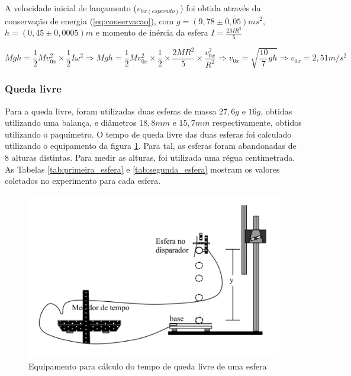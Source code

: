 \documentclass[10pt]{article}
\begin{document}
A velocidade inicial de lançamento ($v_{0x (esperado)}$) foi obtida através da conservação de energia (\ref{eq:conservacao}), com $g = (9,78 \pm 0,05) ms^2$, $h = (0,45 \pm 0,0005)m$ e momento de inércia da esfera $I = \frac{2MR^2}{5}$


\begin{equation}
Mgh = \frac{1}{2}Mv_{0x}^2 \times \frac{1}{2}I\omega^2 \Rightarrow
Mgh = \frac{1}{2}Mv_{0x}^2 \times \frac{1}{2} \times \frac{2MR^2}{5}  \times \frac{v_{0x}^2}{R^2} \Rightarrow
v_{0x} = \sqrt{\frac{10}{7}gh} \Rightarrow v_{0x} = 2,51 m/s^2
\label{eq:conservacao}
\end{equation}

\subsubsection{Queda livre}

Para a queda livre, foram utilizadas duas esferas de massa  $27,6g$ e $16g$, obtidas utilizando uma balança, e diâmetros $18,8mm$ e $15,7mm$ respectivamente, obtidos utilizando o paquímetro. O tempo de queda livre das duas esferas foi calculado utilizando o equipamento da figura \ref{fig:queda_livre}. Para tal, as esferas foram abandonadas de 8 alturas distintas. Para medir as alturas, foi utilizada uma régua centimetrada. As Tabelas \ref{tab:primeira_esfera} e \ref{tab:segunda_esfera} mostram os valores coletados no experimento para cada esfera.

\begin{figure}
	\begin{center}
		\includegraphics[scale=0.5]{queda_livre.png}
		\caption{Equipamento para cálculo do tempo de queda livre de uma esfera}
		\label{fig:queda_livre}
	\end{center}
\end{figure}
\end{document}
